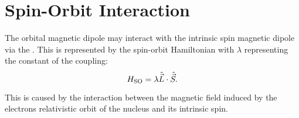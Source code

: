 \section{Spin-Orbit Interaction}
The orbital magnetic dipole may interact with the intrinsic spin magnetic dipole via the . This is represented by the spin-orbit Hamiltonian with $\lambda$ representing the constant of the coupling: 
\begin{equation}
    H_{\ce{SO}} = \lambda \hat{\vec{L}}\cdot\hat{\vec{S}}. 
    \label{eq:spin_orbit_hamiltonian}
\end{equation}

This is caused by the interaction between the magnetic field induced by the electrons relativistic orbit of the nucleus and its intrinsic spin. 
